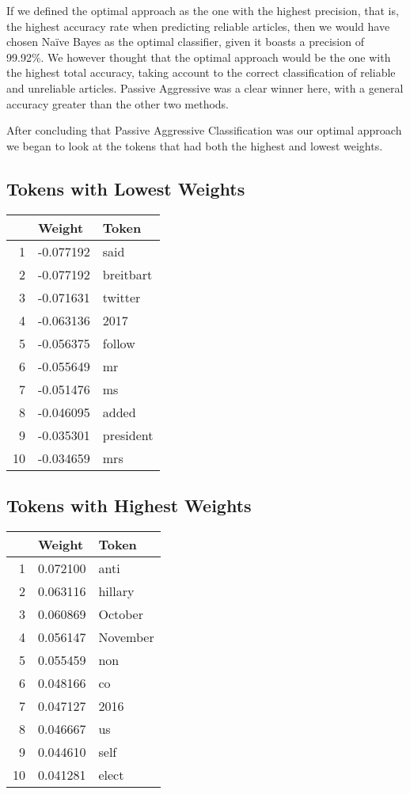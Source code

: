 \documentclass[12pt]{article}
\begin{document}
    If we defined the optimal approach as the one with the highest precision, that is, the highest accuracy rate when predicting reliable articles, then we would have chosen Naïve Bayes as the optimal classifier, given it boasts a precision of 99.92\%. We however thought that the optimal approach would be the one with the highest total accuracy, taking account to the correct classification of reliable and unreliable articles. Passive Aggressive was a clear winner here, with a general accuracy greater than the other two methods.
    
    After concluding that Passive Aggressive Classification was our optimal approach we began to look at the tokens that had both the highest and lowest weights.
    
    \subsection{Tokens with Lowest Weights}
	\begin{tabular}{r | l l}
		    & Weight        & Token         \\
		\hline
		1   & -0.077192     & said          \\
		2   & -0.077192	    & breitbart     \\
		3   & -0.071631     & twitter       \\
		4   & -0.063136	    & 2017          \\
		5   & -0.056375	    & follow        \\
		6   & -0.055649	    & mr            \\
		7   & -0.051476	    & ms            \\
		8   & -0.046095	    & added         \\
		9   & -0.035301	    & president     \\
		10  & -0.034659     & mrs           \\
	\end{tabular}

    \subsection{Tokens with Highest Weights}
	\begin{tabular}{r | l l}
		    & Weight            & Token         \\
		\hline
		1   & 0.072100	        & anti          \\
		2   & 0.063116		    & hillary       \\
		3   & 0.060869          & October       \\
		4   & 0.056147	        & November      \\
		5   & 0.055459	        & non           \\
		6   & 0.048166	        & co            \\
		7   & 0.047127	        & 2016          \\
		8   & 0.046667	        & us            \\
		9   & 0.044610	        & self          \\
		10  & 0.041281          & elect         \\
	\end{tabular}
\end{document}
